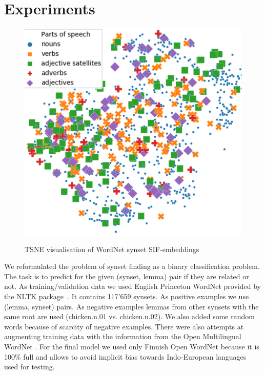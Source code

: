 \documentclass[11pt,a4paper]{article}
\begin{document}
\section{Experiments}
\begin{figure}
	
	\centering
	\small
	\includegraphics[scale=0.5]{wordnet-pos3}\\
	
	\caption{TSNE visualisation of WordNet synset SIF-embeddings}
	\label{wordnet-pos}
\end{figure}
We reformulated the problem of synset finding as a binary classification problem. The task is to predict for the given (synset, lemma) pair if they are related or not. As training/validation data we used English Princeton WordNet \cite{wordnet} provided by the NLTK package~\cite{nltk}. It contains 117'659 synsets. As positive examples we use (lemma, synset) pairs. As negative examples lemmas from other synsets with the same root are used (chicken.n.01 vs. chicken.n.02). We also added some random words because of scarcity of negative examples. There were also attempts at augmenting training data with the information from the Open Multilingual WordNet \cite{bond-wordnet}. For the final model we used only Finnish Open WordNet because it is 100\% full and allows to avoid implicit bias towards Indo-European languages used for testing.
\end{document}
